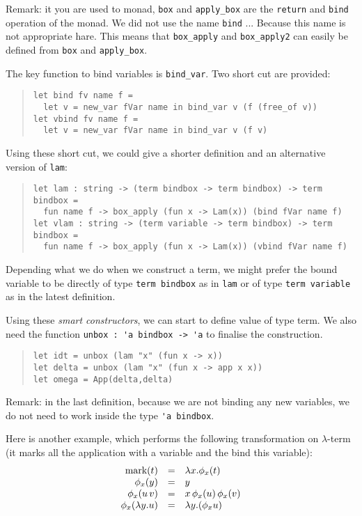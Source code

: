 \documentclass[11pt]{article}
\begin{document}
Remark: it you are used to monad, \verb#box# and \verb#apply_box# are
the \verb#return# and \verb#bind# operation of the monad. We did not
use the name \verb#bind# ... Because this name is not appropriate
hare. This means that \verb#box_apply# and \verb#box_apply2# can
easily be defined from \verb#box# and \verb#apply_box#.

The key function to bind variables is \verb#bind_var#. Two short cut
are provided:
\begin{quote}
\begin{verbatim}
let bind fv name f =
  let v = new_var fVar name in bind_var v (f (free_of v))
let vbind fv name f =
  let v = new_var fVar name in bind_var v (f v)
\end{verbatim}
\end{quote}

Using these short cut, we could give a shorter definition and an
alternative version of \verb#lam#:

\begin{quote}
\begin{verbatim}
let lam : string -> (term bindbox -> term bindbox) -> term bindbox =
  fun name f -> box_apply (fun x -> Lam(x)) (bind fVar name f)
let vlam : string -> (term variable -> term bindbox) -> term bindbox =
  fun name f -> box_apply (fun x -> Lam(x)) (vbind fVar name f)
\end{verbatim}
\end{quote}

Depending what we do when we construct a term, we might prefer
the bound variable to be directly of type \verb#term bindbox# as in
\verb#lam# or of type \verb#term variable# as in the latest definition.

Using these \emph{smart constructors}, we can start to define value of
type term. We also need the function \verb#unbox : 'a bindbox -> 'a#
to finalise the construction.
\begin{quote}
\begin{verbatim}
let idt = unbox (lam "x" (fun x -> x))
let delta = unbox (lam "x" (fun x -> app x x))
let omega = App(delta,delta)
\end{verbatim}
\end{quote}

Remark: in the last definition, because we are not binding any new
variables, we do not need to work inside the type \verb#'a bindbox#.

Here is another example, which performs the following transformation on
$\lambda$-term (it marks all the application with a variable and the
bind this variable):
$$
\begin{array}{rcl}
\hbox{mark}(t) &=& \lambda x.\phi_x(t) \cr
\phi_x(y) &=& y \cr
\phi_x(u\,v) &=& x\,\phi_x(u)\,\phi_x(v) \cr
\phi_x(\lambda y.u) &=& \lambda y.(\phi_x u)
\end{array}
$$
\end{document}
